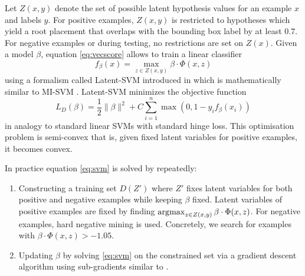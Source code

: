 Let $Z(x,y)$ denote the set of possible latent hypothesis values for an example $x$ and labels $y$. For positive examples, $Z(x,y)$ is restricted to hypotheses which yield a root placement that overlaps with the bounding box label by at least $0.7$. For negative examples or during testing, no restrictions are set on $Z(x)$. Given a model $\beta$, equation \ref{eq:vecscore} allows to train a linear classifier 
\begin{equation}
f_\beta(x)=\max_{z\in Z(x,y)}\beta\cdot\Phi(x,z)
\end{equation}
using a formalism called Latent-SVM introduced in \cite{5255236} which is mathematically similar to MI-SVM \cite{andrewssupport}. Latent-SVM minimizes the objective function
\begin{equation}\label{eq:svm}
L_D(\beta)=\frac{1}{2}\|\beta\|^2+C\sum_{i=1}^n\max(0,1-y_if_\beta(x_i))
\end{equation}
in analogy to standard linear SVMs with standard hinge loss. This optimisation problem is semi-convex that is, given fixed latent variables for positive examples, it becomes convex. 

In practice equation \ref{eq:svm} is solved by repeatedly:
\begin{enumerate}\label{proc:train}
  \item Constructing a training set $D(Z')$ where $Z'$ fixes latent variables for both positive and negative examples while keeping $\beta$ fixed. Latent variables of positive examples are fixed by  finding $\operatorname*{\arg\!\max}_{z\in Z(x,y)}\beta\cdot\Phi(x,z)$. For negative examples, hard negative mining is used. Concretely, we search for examples with $\beta\cdot\Phi(x,z)>-1.05$.
  \item Updating $\beta$ by solving \ref{eq:svm} on the constrained set via a gradient descent algorithm using sub-gradients similar to \cite{shalev2011pegasos}. 
\end{enumerate}

